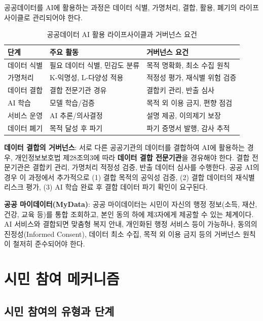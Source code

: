 공공데이터를 AI에 활용하는 과정은 데이터 식별, 가명처리, 결합, 활용, 폐기의 라이프사이클로 관리되어야 한다.

\begin{table}[htbp]
\centering
\caption{공공데이터 AI 활용 라이프사이클과 거버넌스 요건}
\label{tab:18_data_lifecycle}
\begin{tabularx}{\textwidth}{p{2cm}Xp{4cm}}
\toprule
\textbf{단계} & \textbf{주요 활동} & \textbf{거버넌스 요건} \\
\midrule
데이터 식별 & 필요 데이터 식별, 민감도 분류 & 목적 명확화, 최소 수집 원칙 \\
가명처리 & K-익명성, L-다양성 적용 & 적정성 평가, 재식별 위험 검증 \\
데이터 결합 & 결합 전문기관 경유 & 결합키 관리, 반출 심사 \\
AI 학습 & 모델 학습/검증 & 목적 외 이용 금지, 편향 점검 \\
서비스 운영 & AI 추론/의사결정 & 설명 제공, 이의제기 보장 \\
데이터 폐기 & 목적 달성 후 파기 & 파기 증명서 발행, 감사 추적 \\
\bottomrule
\end{tabularx}
\end{table}

\textbf{데이터 결합의 거버넌스}: 서로 다른 공공기관의 데이터를 결합하여 AI에 활용하는 경우, 개인정보보호법 제28조의3에 따라 \textbf{데이터 결합 전문기관}을 경유해야 한다. 결합 전문기관은 결합키 관리, 가명처리 적정성 검증, 반출 데이터 심사를 수행한다. 공공 AI의 경우 이 과정에서 추가적으로 (1) 결합 목적의 공익성 검증, (2) 결합 데이터의 재식별 리스크 평가, (3) AI 학습 완료 후 결합 데이터 파기 확인이 요구된다.

\textbf{공공 마이데이터(MyData)}: 공공 마이데이터는 시민이 자신의 행정 정보(소득, 재산, 건강, 교육 등)를 통합 조회하고, 본인 동의 하에 제3자에게 제공할 수 있는 체계이다. AI 서비스와 결합되면 맞춤형 복지 안내, 개인화된 행정 서비스 등이 가능하나, 동의의 진정성(Informed Consent), 데이터 최소 수집, 목적 외 이용 금지 등의 거버넌스 원칙이 철저히 준수되어야 한다.

\section{시민 참여 메커니즘}
\label{sec:18.2.4}

\subsection{시민 참여의 유형과 단계}

